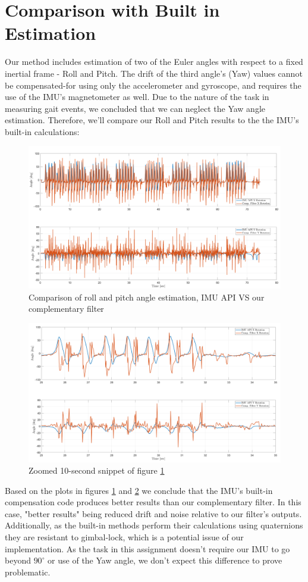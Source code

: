 \documentclass[10pt]{article}
\begin{document}
\section{Comparison with Built in Estimation}
Our method includes estimation of two of the Euler angles with respect to a fixed inertial frame - Roll and Pitch. The drift of the third angle's (Yaw) values cannot be compensated-for using only the accelerometer and gyroscope, and requires the use of the IMU's magnetometer as well. Due to the nature of the task in measuring gait events, we concluded that we can neglect the Yaw angle estimation. Therefore, we'll compare our Roll and Pitch results to the the IMU's built-in calculations:
\begin{figure}[!h]
    \centering
    \includegraphics[width=0.75\linewidth]{image.png}
    \caption{Comparison of roll and pitch angle estimation, IMU API VS our complementary filter}
    \label{fig:imuVScomp}
\end{figure}
\begin{figure} [!h]
    \centering
    \includegraphics[width=0.75\linewidth]{image2.png}
    \caption{Zoomed 10-second snippet of figure \ref{fig:imuVScomp}}
    \label{fig:imuVScompZoom}
\end{figure}
Based on the plots in figures \ref{fig:imuVScomp} and \ref{fig:imuVScompZoom} we conclude that the IMU's built-in compensation code produces better results than our complementary filter. In this case, "better results" being reduced drift and noise relative to our filter's outputs. Additionally, as the built-in methods perform their calculations using quaternions they are resistant to gimbal-lock, which is a potential issue of our implementation. As the task in this assignment doesn't require our IMU to go beyond $90^{\circ}$ or use of the Yaw angle, we don't expect this difference to prove problematic.
\end{document}
